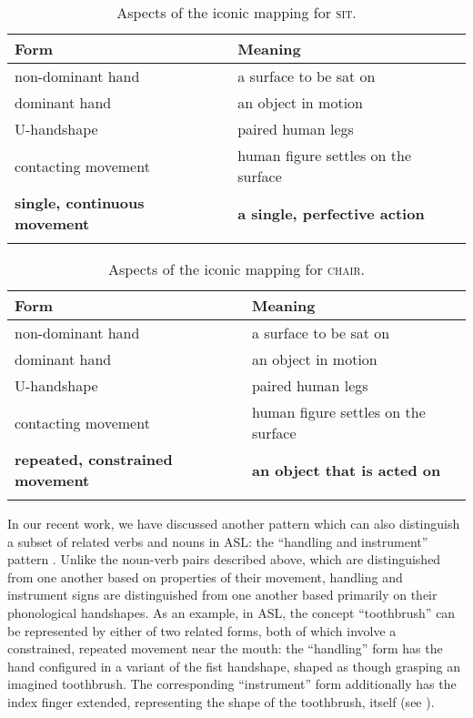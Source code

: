 \documentclass[output=paper,
modfonts
]{LSP/langsci}
\begin{document}
\begin{table}
\caption{Aspects of the iconic mapping for \textsc{sit}.}
\label{tab:11}
\begin{tabular}{ll}
\lsptoprule
Form & Meaning\\
\midrule
non-dominant hand & a surface to be sat on\\

dominant hand & an object in motion\\

U-handshape & paired human legs\\

contacting movement & human figure settles on the surface\\

\textbf{single, continuous movement} & \textbf{a single, perfective action}\\
\lspbottomrule
\end{tabular}
\end{table}

\begin{table}
\caption{Aspects of the iconic mapping for \textsc{chair}.}
\label{tab:12}
\begin{tabular}{ll}
\lsptoprule
Form & Meaning\\
\midrule
non-dominant hand & a surface to be sat on\\

dominant hand & an object in motion\\

U-handshape & paired human legs\\

contacting movement & human figure settles on the surface\\

\textbf{repeated, constrained movement} & \textbf{an object that is acted on}\\
\lspbottomrule
\end{tabular}
\end{table}

  In our recent work, we have discussed another pattern which can also distinguish a subset of related verbs and nouns in ASL: the ``handling and instrument'' pattern \citep{Padden2015}. Unlike the noun-verb pairs described above, which are distinguished from one another based on properties of their movement, handling and instrument signs are distinguished from one another based primarily on their phonological handshapes. As an example, in ASL, the concept ``toothbrush'' can be represented by either of two related forms, both of which involve a constrained, repeated movement near the mouth: the ``handling'' form has the hand configured in a variant of the fist handshape, shaped as though grasping an imagined toothbrush. The corresponding ``instrument'' form additionally has the index finger extended, representing the shape of the toothbrush, itself (see \citealt[82]{Padden2015}).
\end{document}
